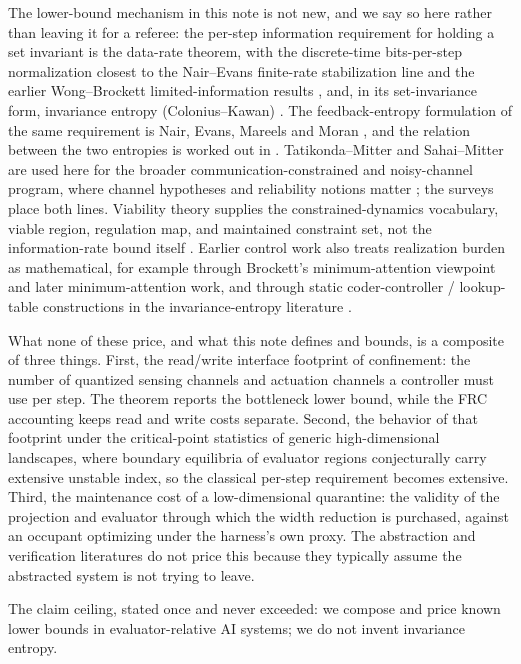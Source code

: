 \documentclass[11pt]{article}
\theoremstyle{definition}
\theoremstyle{remark}
\begin{document}
The lower-bound mechanism in this note is not new, and we say so here rather than leaving it for a referee: the per-step information requirement for holding a set invariant is the data-rate theorem, with the discrete-time bits-per-step normalization closest to the Nair--Evans finite-rate stabilization line \cite{nair2000} and the earlier Wong--Brockett limited-information results \cite{wong1999}, and, in its set-invariance form, invariance entropy (Colonius--Kawan) \cite{colonius2009,kawan2013,kawan2011}. The feedback-entropy formulation of the same requirement is Nair, Evans, Mareels and Moran \cite{nair2004}, and the relation between the two entropies is worked out in \cite{colonius2013}. Tatikonda--Mitter and Sahai--Mitter are used here for the broader communication-constrained and noisy-channel program, where channel hypotheses and reliability notions matter \cite{tatikonda2004,sahai2006}; the surveys \cite{nair2007,hespanha2007} place both lines. Viability theory supplies the constrained-dynamics vocabulary, viable region, regulation map, and maintained constraint set, not the information-rate bound itself \cite{aubin1991}. Earlier control work also treats realization burden as mathematical, for example through Brockett's minimum-attention viewpoint and later minimum-attention work, and through static coder-controller / lookup-table constructions in the invariance-entropy literature \cite{brockett1997,lee2022,donkers2014,tomar2022}.

What none of these price, and what this note defines and bounds, is a composite of three things. First, the read/write interface footprint of confinement: the number of quantized sensing channels and actuation channels a controller must use per step. The theorem reports the bottleneck lower bound, while the FRC accounting keeps read and write costs separate. Second, the behavior of that footprint under the critical-point statistics of generic high-dimensional landscapes, where boundary equilibria of evaluator regions conjecturally carry extensive unstable index, so the classical per-step requirement becomes extensive. Third, the maintenance cost of a low-dimensional quarantine: the validity of the projection and evaluator through which the width reduction is purchased, against an occupant optimizing under the harness's own proxy. The abstraction and verification literatures \cite{tabuada2009,girard2007} do not price this because they typically assume the abstracted system is not trying to leave.

The claim ceiling, stated once and never exceeded: we compose and price known lower bounds in evaluator-relative AI systems; we do not invent invariance entropy.
\end{document}
